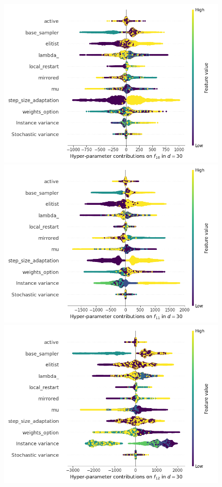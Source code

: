 \begin{figure}[t]
	\includegraphics[height=0.15\textheight,trim=60mm 0mm 30mm 0mm,clip]{cma_img_new/img_summary_f10_d30.png}
	\includegraphics[height=0.15\textheight,trim=60mm 0mm 30mm 0mm,clip]{cma_img_new/img_summary_f11_d30.png}
	\includegraphics[height=0.15\textheight,trim=60mm 0mm 0mm 0mm,clip]{cma_img_new/img_summary_f12_d30.png}

\end{figure}
